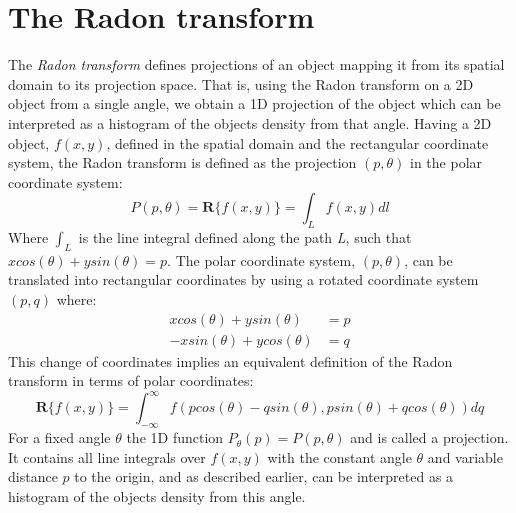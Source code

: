 \section{The Radon transform}
The \textit{Radon transform} defines projections of an object mapping it from its spatial domain to its projection space. That is, using the Radon transform on a 2D object from a single angle, we obtain a 1D projection of the object which can be interpreted as a histogram of the objects density from that angle. Having a 2D object, $f(x,y)$, defined in the spatial domain and the rectangular coordinate system, the Radon transform is defined as the projection $(p,\theta)$ in the polar coordinate system:
\begin{equation} \label{linearity}
	P(p,\theta) = \mathbf{R}\{f(x,y)\} = \int_L f(x,y) dl
\end{equation}  
Where $\int_L$ is the line integral defined along the path \textit{L}, such that $xcos(\theta) + ysin(\theta) = p$. The polar coordinate system, $(p,\theta)$, can be translated into rectangular coordinates by using a rotated coordinate system $(p,q)$ where:
\begin{align*}
	xcos(\theta) + ysin(\theta) &= p \\
	-xsin(\theta) + ycos(\theta) & = q
\end{align*}
This change of coordinates implies an equivalent definition of the Radon transform in terms of polar coordinates:
\begin{equation*}
	\mathbf{R}\{f(x,y)\} = \int_{-\infty}^{\infty}f(pcos(\theta) - qsin(\theta),psin(\theta)+qcos(\theta))dq
\end{equation*}
For a fixed angle $\theta$ the 1D function $P_{\theta}(p) = P(p,\theta)$ and is called a projection. It contains all line integrals over $f(x,y)$ with the constant angle $\theta$ and variable distance $p$ to the origin, and as described earlier, can be interpreted as a histogram of the objects density from this angle.\\
